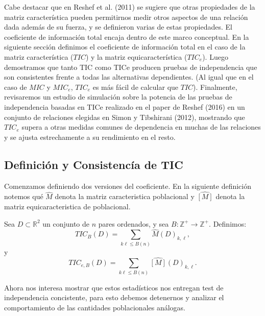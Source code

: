         Cabe destacar que en Reshef et al. (2011)\cite{Reshef2011} se sugiere que otras propiedades de la matriz caracter\'istica pueden permitirnos medir otros aspectos de una relaci\'on dada adem\'as de su fuerza, y se definieron varias de estas propiedades. El coeficiente de informaci\'on total encaja dentro de este marco conceptual. En la siguiente secci\'on definimos el coeficiente de informaci\'on total en el caso de la matriz caracter\'istica ($TIC$) y la matriz equicaracter\'istica ($TIC_e$). Luego demostramos que tanto TIC como TICe producen pruebas de independencia que son consistentes frente a todas las alternativas dependientes. (Al igual que en el caso de $MIC$ y $MIC_e$, $TIC_e$ es m\'as f\'acil de calcular que $TIC$). Finalmente, revisaremos un estudio de simulaci\'on sobre la potencia de las pruebas de independencia basadas en TICe realizado en el paper de Reshef (2016)\cite{Reshef2016} en un conjunto de relaciones elegidas en Simon y Tibshirani (2012)\cite[]{SimonTibshirani}, mostrando que $TIC_e$ supera a otras medidas comunes de dependencia en muchas de las relaciones y se ajusta estrechamente a su rendimiento en el resto.
    
    
        \subsection[definicionyconcitenciatic]{Definici\'on y Consistenc\'ia de TIC}
    
        Comenzamos definiendo dos versiones del coeficiente. En la siguiente definici\'on notemos qu\'e $\widehat{M}$ denota la matriz caracteristica poblacional y $\widehat{[M]}$ denota la matriz equicaracteristica de poblacional.
    
        \begin{defn}
            Sea $D \subset \mathbb{R}^2$ un conjunto de $n$ pares ordenados, y sea $B: \mathbb{Z}^{+} \rightarrow \mathbb{Z}^{+}$. Definimos:
            $$
            T I C_B(D)=\sum_{k \ell \leq B(n)} \widehat{M}(D)_{k, \ell},
            $$
            y
            $$
            T I C_{e, B}(D)=\sum_{k \ell \leq B(n)} \widehat{[M]}(D)_{k, \ell}.
            $$
        \end{defn}
    
        Ahora nos interesa mostrar que estos estad\'isticos nos entregan test de independencia concistente, para esto debemos detenernos y analizar el comportamiento de las cantidades poblacionales an\'alogas. 
    
